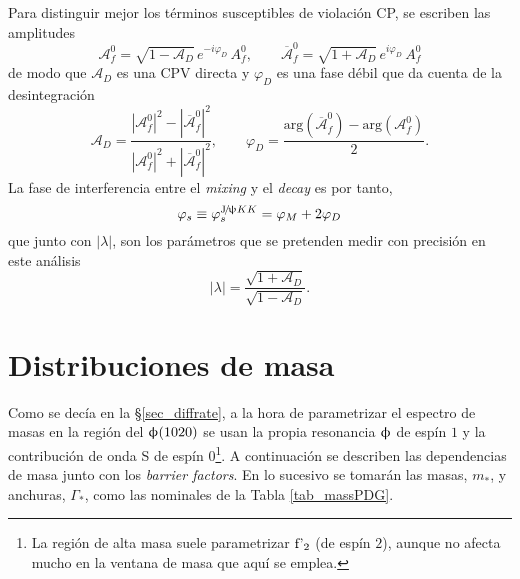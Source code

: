 Para distinguir mejor los términos susceptibles de violación CP, se escriben las amplitudes
\[\mathcal{A}_f^0 = \sqrt{1-\mathscr{A}_D} \, e^{-i \varphi_D} \, A_f^0, \qquad \overline{\mathcal{A}}_f^0 = \sqrt{1+\mathscr{A}_D} \, e^{i \varphi_D} \, A_f^0 \]
de modo que $\mathscr{A}_D $ es una CPV directa y $\varphi_D$ es una fase débil que da cuenta de la desintegración
\begin{equation}
	\mathscr{A}_D = \frac{|\mathcal{A}_f^0|^2-|\overline{\mathcal{A}}_f^0|^2}{|\mathcal{A}_f^0|^2+|\overline{\mathcal{A}}_f^0|^2}, \qquad \varphi_D = \frac{\text{arg}(\overline{\mathcal{A}}_f^0)-\text{arg}(\mathcal{A}_f^0)}{2}.
\end{equation}
%
La fase de interferencia entre el \textit{mixing} y el \emph{decay} es por tanto,
\begin{equation}
	\varphi_s \equiv \varphi_s^{\text{J}\!/\!\uppsi KK} = \varphi_{M} + 2 \varphi_{D} \label{eq_phismixdecay}
\end{equation}
que junto con $|\lambda|$, son los parámetros que se pretenden medir con precisión en este análisis
\begin{equation}
|\lambda| = \frac{\sqrt{1+\mathscr{A}_D}}{\sqrt{1-\mathscr{A}_D}}	.
\end{equation}





\section{Distribuciones de masa} %


Como se decía en la \S \ref{sec_diffrate}, a la hora de parametrizar el espectro de masas en la región del $\upphi(1020)$ se usan la propia resonancia $\upphi$ de espín $1$ y la contribución de onda S  de espín $0$\footnote{La región de alta masa suele parametrizar $\text{f'}_2$ (de espín $2$), aunque no afecta mucho en la ventana de masa que aquí se emplea.}. A continuación se describen las dependencias de masa junto con los \emph{barrier factors}. 
%
\color{dieg}
En lo sucesivo se tomarán las masas,  $m_{*}$, y anchuras, $\Gamma_{*
}$, como las nominales de la Tabla \ref{tab_massPDG}.


\color{dieg}

